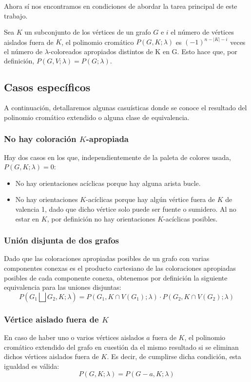 \documentclass{article}
\numberwithin{figure}{section}
\begin{document}
Ahora sí nos encontramos en condiciones de abordar la tarea principal de este trabajo.

Sea $K$ un subconjunto de los vértices de un grafo $G$ e $i$ el número de vértices aislados fuera de $K$, el polinomio cromático $P(G, K; \lambda)$ es $(-1)^{n-|K|-i}$ veces el número de $\lambda$-coloreados apropiados distintos de K en G. Esto hace que, por definición, $P(G, V; \lambda) = P(G; \lambda)$.

\subsection{Casos específicos}

A continuación, detallaremos algunas casuísticas donde se conoce el resultado del polinomio cromático extendido o alguna clase de equivalencia.

\subsubsection{No hay coloración $K$-apropiada}
    Hay dos casos en los que, independientemente de la paleta de colores usada, $P(G, K; \lambda) = 0$:
    \begin{itemize}
        \item No hay orientaciones acíclicas porque hay alguna arista bucle.
        \item No hay orientaciones $K$-acíclicas porque hay algún vértice fuera de $K$ de valencia 1, dado que dicho vértice solo puede ser fuente o sumidero. Al no estar en $K$, por definición no hay orientaciones $K$-acíclicas posibles.
    \end{itemize}

\subsubsection{Unión disjunta de dos grafos}
    Dado que las coloraciones apropiadas posibles de un grafo con varias componentes conexas es el producto cartesiano de las coloraciones apropiadas posibles de cada componente conexa, obtenemos por definición la siguiente equivalencia para las uniones disjuntas:
    \begin{equation*}
        P(G_1 \bigsqcup G_2, K; \lambda) = P(G_1, K \cap V(G_1); \lambda) \cdot P(G_2, K \cap V(G_2); \lambda)
    \end{equation*}

\subsubsection{Vértice aislado fuera de $K$}
    En caso de haber uno o varios vértices aislados $a$ fuera de $K$, el polinomio cromático extendido del grafo en cuestión da el mismo resultado si se eliminan dichos vértices aislados fuera de $K$. Es decir, de cumplirse dicha condición, esta igualdad es válida:
    \begin{equation*}
        P(G, K; \lambda) = P(G - a, K; \lambda)
    \end{equation*}
    
\end{document}
